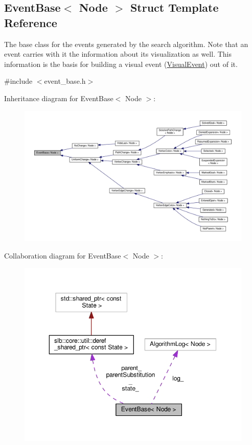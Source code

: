 \hypertarget{structEventBase}{}\subsection{Event\+Base$<$ Node $>$ Struct Template Reference}
\label{structEventBase}


The base class for the events generated by the search algorithm. Note that an event carries with it the information about its visualization as well. This information is the basis for building a visual event (\hyperlink{structVisualEvent}{Visual\+Event}) out of it.  




{\ttfamily \#include $<$event\+\_\+base.\+h$>$}



Inheritance diagram for Event\+Base$<$ Node $>$\+:\nopagebreak
\begin{figure}[H]
\begin{center}
\leavevmode
\includegraphics[width=350pt]{structEventBase__inherit__graph}
\end{center}
\end{figure}


Collaboration diagram for Event\+Base$<$ Node $>$\+:\nopagebreak
\begin{figure}[H]
\begin{center}
\leavevmode
\includegraphics[width=350pt]{structEventBase__coll__graph}
\end{center}
\end{figure}
